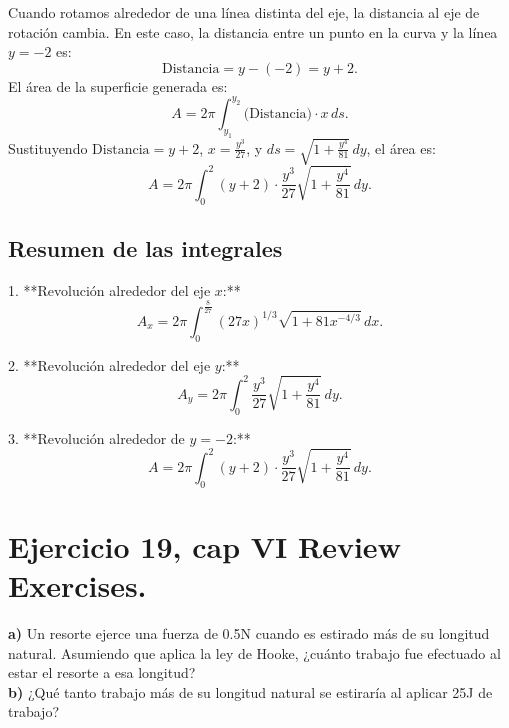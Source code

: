 \documentclass[11pt,letterpaper]{article}
\begin{document}
Cuando rotamos alrededor de una línea distinta del eje, la distancia al eje de rotación cambia. En este caso, la distancia entre un punto en la curva y la línea \(y = -2\) es:
\[
\text{Distancia} = y - (-2) = y + 2.
\]
El área de la superficie generada es:
\[
A = 2\pi \int_{y_1}^{y_2} \text{(Distancia)} \cdot x \, ds.
\]
Sustituyendo \(\text{Distancia} = y + 2\), \(x = \frac{y^3}{27}\), y \(ds = \sqrt{1 + \frac{y^4}{81}} \, dy\), el área es:
\[
A = 2\pi \int_{0}^{2} (y + 2) \cdot \frac{y^3}{27} \sqrt{1 + \frac{y^4}{81}} \, dy.
\]

\subsection*{Resumen de las integrales}

1. **Revolución alrededor del eje \(x\):**
\[
A_x = 2\pi \int_{0}^{\frac{8}{27}} (27x)^{1/3} \sqrt{1 + 81x^{-4/3}} \, dx.
\]

2. **Revolución alrededor del eje \(y\):**
\[
A_y = 2\pi \int_{0}^{2} \frac{y^3}{27} \sqrt{1 + \frac{y^4}{81}} \, dy.
\]

3. **Revolución alrededor de \(y = -2\):**
\[
A = 2\pi \int_{0}^{2} (y + 2) \cdot \frac{y^3}{27} \sqrt{1 + \frac{y^4}{81}} \, dy.
\]


\section{Ejercicio 19, cap VI Review Exercises.}
\textbf{a)} Un resorte ejerce una fuerza de 0.5N cuando es estirado más de su longitud natural.
Asumiendo que aplica la ley de Hooke, ¿cuánto trabajo fue efectuado al estar el resorte a esa longitud?\\
\textbf{b)} ¿Qué tanto trabajo más de su longitud natural se estiraría al aplicar 25J de trabajo?
\end{document}
